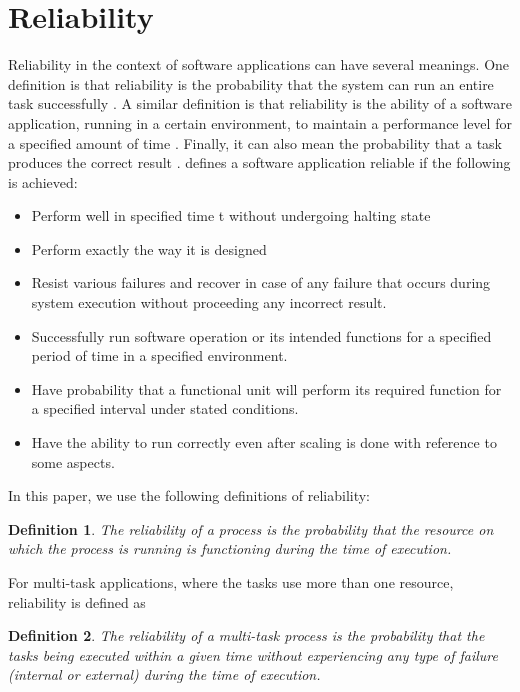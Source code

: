 \documentclass{cslthse-msc}
\newtheorem{definition}{Definition}[chapter]
\begin{document}
\section{Reliability} \label{sec:theory_reliability}
Reliability in the context of software applications can have several meanings. One definition is that reliability is the probability that the system can run an entire task successfully \cite{taskAllocation}. A similar definition is that reliability is the ability of a software application, running in a certain environment, to maintain a performance level for a specified amount of time \cite{X}. Finally, it can also mean the probability that a task produces the correct result \cite{X}. \cite{surveyReliabilityDistr} defines a software application reliable if the following is achieved:
\begin{itemize}
\item Perform well in specified time t without undergoing halting state
\item Perform exactly the way it is designed
\item Resist various failures and recover in case of any failure that occurs during system execution without proceeding any incorrect result.
\item Successfully run software operation or its intended functions for a specified period of time in a specified environment.
\item Have probability that a functional unit will perform its required function for a specified interval under stated conditions.
\item Have the ability to run correctly even after scaling is done with reference to some aspects.
\end{itemize}


In this paper, we use the following definitions of reliability:
\begin{definition} \label{def:single_task_reliability}
The reliability of a process is the probability that the resource on which the process is running is functioning during the time of execution.
\end{definition}

For multi-task applications, where the tasks use more than one resource, reliability is defined as
\begin{definition} \label{def:multi_task_reliability}
The reliability of a multi-task process is the probability that the tasks being executed within a given time without experiencing any type of failure (internal or external) during the time of execution.
\end{definition}
\end{document}
